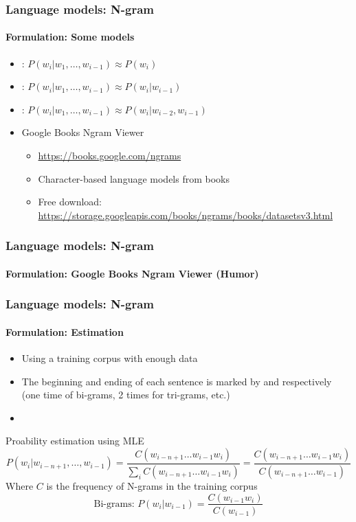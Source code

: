 \documentclass[xcolor=table]{beamer}
\begin{document}
\begin{frame}
\frametitle{Language models: N-gram}
\framesubtitle{Formulation: Some models}

\begin{itemize}
	\item {}: $P(w_i | w_1,\ldots, w_{i-1}) \approx P(w_i)$
	\item {}: $P(w_i | w_1,\ldots, w_{i-1}) \approx P(w_i | w_{i-1})$
	\item {}:  $P(w_i | w_1,\ldots, w_{i-1}) \approx P(w_i | w_{i-2}, w_{i-1})$
	\item Google Books Ngram Viewer
	\begin{itemize}
		\item \url{https://books.google.com/ngrams}
		\item Character-based language models from books 
		\item Free download: \url{https://storage.googleapis.com/books/ngrams/books/datasetsv3.html}
	\end{itemize}
\end{itemize}

\end{frame}

\begin{frame}
\frametitle{Language models: N-gram}
\framesubtitle{Formulation: Google Books Ngram Viewer (Humor)}

\begin{center}
\end{center}

\end{frame}

\begin{frame}
\frametitle{Language models: N-gram}
\framesubtitle{Formulation: Estimation}

\begin{itemize}
	\item Using a training corpus with enough data
	\item The beginning and ending of each sentence is marked by  and  respectively (one time of bi-grams, 2 times for tri-grams, etc.)
	\item {}
\end{itemize}

\begin{block}{Proability estimation using MLE}
	{\small \[%
	P(w_i | w_{i-n+1},\ldots, w_{i-1}) = \frac{C(w_{i-n+1} \ldots w_{i-1} w_i)}{\sum_i C(w_{i-n+1} \ldots w_{i-1} w_i)}
	= \frac{C(w_{i-n+1} \ldots w_{i-1} w_i)}{C(w_{i-n+1} \ldots w_{i-1})}
	\]}
	Where $C$ is the frequency of N-grams in the training corpus
	\[%
	\text{Bi-grams: } P(w_i | w_{i-1}) = \frac{C(w_{i-1} w_i)}{C(w_{i-1})}
	\]
\end{block}

\end{frame}
\end{document}
